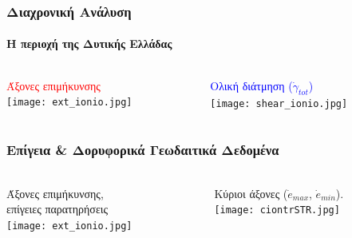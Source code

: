 \begin{frame}
  \frametitle{Διαχρονική Ανάλυση}
  \framesubtitle{Η περιοχή της Δυτικής Ελλάδας}
  \label{fr5:allpp_ionio}
  \begin{columns}
    \begin{column}{.5\textwidth}
    \centering
      \textcolor{red}{\small Άξονες επιμήκυνσης}\\
      \texttt{[image: ext\_ionio.jpg]}

    \end{column}
    \begin{column}{.5\textwidth}
    \centering
      \textcolor{blue}{\small Ολική διάτμηση ($\dot{\gamma}_{tot}$)}\\
      \texttt{[image: shear\_ionio.jpg]}

    \end{column}
  \end{columns}
\end{frame}
\note{}


\begin{frame}
  \frametitle{Επίγεια \& Δορυφορικά Γεωδαιτικά Δεδομένα}
  \framesubtitle{}
  \label{fr6:terr_sat_ext}
  \begin{columns}
    \begin{column}{.5\textwidth}
     \centering
     {\footnotesize  Άξονες επιμήκυνσης,\\ επίγειες παρατηρήσεις}\\
      \texttt{[image: ext\_ionio.jpg]}

    \end{column}
    \begin{column}{.5\textwidth}
    \centering
    {\footnotesize  Κύριοι άξονες ($\dot{e}_{max}$, $\dot{e}_{min}$).}\\
      \texttt{[image: ciontrSTR.jpg]}

    \end{column}
  \end{columns}
\end{frame}
\note{}

